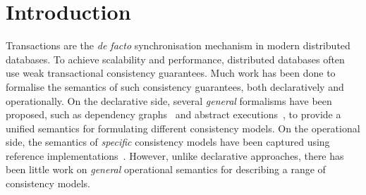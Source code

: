 \section{Introduction}
Transactions are the \emph{de facto} synchronisation mechanism in modern distributed databases.
To achieve scalability and performance, distributed databases  
often use weak transactional consistency guarantees. 
Much work has been done to formalise the semantics of such consistency guarantees, both
declaratively and operationally.
On the declarative side, several \emph{general} formalisms have been proposed, 
such as dependency graphs~\cite{adya} and abstract executions~\cite{ev_transactions}, to provide a unified
semantics for formulating different consistency models.  
On the operational side, the semantics of \emph{specific} consistency models have
been captured using reference implementations~\cite{si,PSI,PSI-RA}. 
However, unlike declarative approaches, there has been
little work on \emph{general} operational semantics for describing a range
of consistency models.


